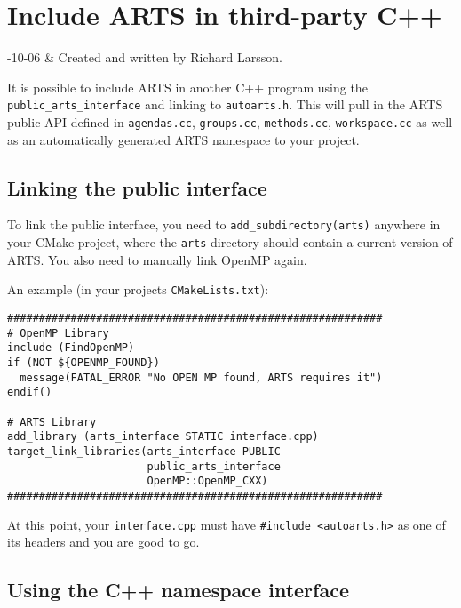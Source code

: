 \chapter{Include ARTS in third-party C++}
\label{sec:cpp_api}

-10-06 & Created and written by Richard Larsson.\\
\stophistory

%
%

It is possible to include ARTS in another C++ program using
the \verb|public_arts_interface| and linking to \verb|autoarts.h|.
This will pull in the ARTS public API defined in \verb|agendas.cc|,
\verb|groups.cc|, \verb|methods.cc|, \verb|workspace.cc| as well
as an automatically generated ARTS namespace to your project.


\section{Linking the public interface}
\label{sec:cpp_api:public_linking}

To link the public interface, you need to \verb|add_subdirectory(arts)|
anywhere in your CMake project, where the \verb|arts| directory should contain
a current version of ARTS.  You also need to manually link OpenMP again.

An example (in your projects \verb|CMakeLists.txt|):
\begin{verbatim}
###########################################################
# OpenMP Library
include (FindOpenMP)
if (NOT ${OPENMP_FOUND})
  message(FATAL_ERROR "No OPEN MP found, ARTS requires it")
endif()

# ARTS Library
add_library (arts_interface STATIC interface.cpp)
target_link_libraries(arts_interface PUBLIC
                      public_arts_interface
                      OpenMP::OpenMP_CXX)
###########################################################
\end{verbatim}

At this point, your \verb|interface.cpp| must have
\verb|#include <autoarts.h>| as one of its headers
and you are good to go.

\section{Using the C++ namespace interface}
\label{sec:cpp_api:usage}

